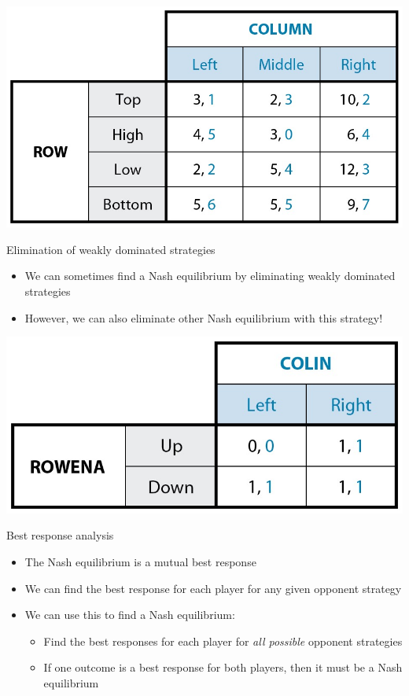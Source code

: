 \documentclass[10pt]{beamer}
\begin{document}
\begin{frame}[label={sec:orgdecf9cf}]{}
\begin{center}
\includegraphics[width=.75\textwidth]{./img/GAMES4_FIG04.03.jpg}
\end{center}
\end{frame}



\begin{frame}[label={sec:org8cdde7c}]{}
\alert{Elimination of weakly dominated strategies}
\begin{itemize}
\item We can sometimes find a Nash equilibrium by eliminating weakly dominated strategies
\item However, we can also eliminate other Nash equilibrium with this strategy!
\end{itemize}
\end{frame}

\begin{frame}[label={sec:org18cf05c}]{}
\begin{center}
\includegraphics[width=.75\textwidth]{./img/GAMES4_FIG04.06.jpg}
\end{center}
\end{frame}

\begin{frame}[label={sec:org15e27e9}]{}
\alert{Best response analysis}
\begin{itemize}
\item The Nash equilibrium is a mutual best response
\item We can find the best response for each player for any given opponent strategy
\item We can use this to find a Nash equilibrium:
\begin{itemize}
\item Find the best responses for each player for \emph{all possible} opponent strategies
\item If one outcome is a best response for both players, then it must be a Nash equilibrium
\end{itemize}
\end{itemize}
\end{frame}
\end{document}
